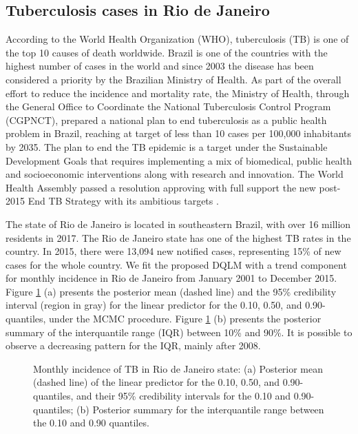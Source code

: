 \documentclass[12pt,a4paper]{article}\usepackage[]{graphicx}\usepackage[]{color}\usepackage{subfigure}
\begin{document}
 

 \subsection{Tuberculosis cases in Rio de Janeiro}


According to the World Health Organization (WHO), tuberculosis (TB) is one of the top 10 causes of death worldwide. 
Brazil is one of the countries with the highest number of cases in the world and since 2003 the disease has been considered a priority by the Brazilian Ministry of Health. 
As part of the overall effort to reduce the incidence and mortality rate, the Ministry of Health, through the General Office to Coordinate the National Tuberculosis Control Program (CGPNCT), prepared a national plan to end tuberculosis as a public health problem in Brazil, reaching at target of less than 10 cases per 100,000 inhabitants by 2035.
The plan to end the TB epidemic is a target under the Sustainable Development Goals that requires implementing a mix of biomedical, public health and socioeconomic interventions along with research and innovation. 
The World Health Assembly passed a resolution approving with full support the new post-2015 End TB Strategy with its ambitious targets \cite{who2014}. 

The state of Rio de Janeiro is located in southeastern Brazil, with over 16 million residents in 2017.
The Rio de Janeiro state has one of the highest TB rates in the country. 
In 2015, there were 13,094  new notified cases, representing 15\% of new cases for the whole country.
We fit the proposed DQLM with a trend component for monthly incidence in Rio de Janeiro from January 2001 to December 2015. 
Figure \ref{applic_TB_data} (a) presents the posterior mean (dashed line) and the 95\% credibility interval (region in gray) for the linear predictor
for the 0.10, 0.50, and 0.90-quantiles, under the MCMC procedure. Figure \ref{applic_TB_data} (b) presents
the posterior summary of the interquantile range (IQR) between 10\% and 90\%. It is possible to observe a decreasing pattern for the IQR, mainly after 2008.
 \begin{figure}[!hbt]
\begin{center}
\hspace{-0.3 cm}\hspace{-0.3 cm}
\vspace{-0.3 cm}\caption{ Monthly incidence of TB in Rio de Janeiro state: (a) Posterior mean (dashed line) of the linear predictor for the 0.10, 0.50, and 0.90-quantiles, and their 95\% credibility intervals for the 0.10 and 0.90-quantiles; (b) Posterior summary for the interquantile range between the 0.10 and 0.90 quantiles.}
\label{applic_TB_data}
\end{center}
\end{figure}
\end{document}
